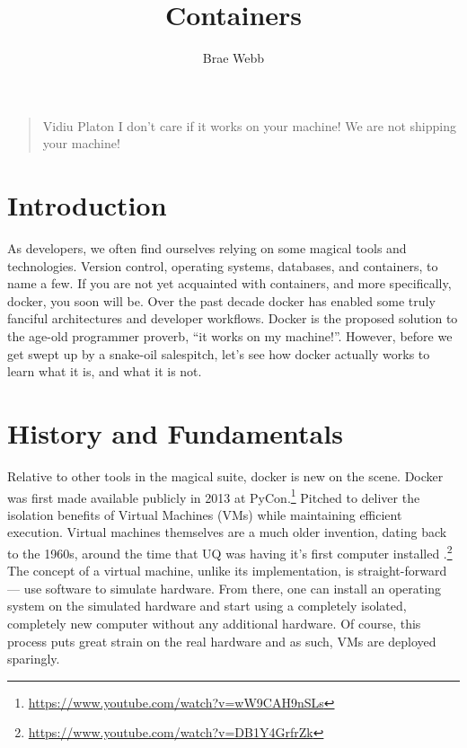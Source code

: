 \title{Containers}
\author{Brae Webb}
\date{}

\maketitle


\begin{quote}{Vidiu Platon}
I don't care if it works on your machine! We are not shipping your machine!
\end{quote}

\section{Introduction}
As developers, we often find ourselves relying on some magical tools and technologies.
Version control, operating systems, databases, and containers, to name a few.
If you are not yet acquainted with containers, and more specifically, docker, you soon will be.
Over the past decade docker has enabled some truly fanciful architectures and developer workflows.
Docker is the proposed solution to the age-old programmer proverb, ``it works on my machine!''.
However, before we get swept up by a snake-oil salespitch, let's see how docker actually works to learn what it is, and what it is not.

\section{History and Fundamentals}
Relative to other tools in the magical suite, docker is new on the scene.
Docker was first made available publicly in 2013 at PyCon.\footnote{\url{https://www.youtube.com/watch?v=wW9CAH9nSLs}}
Pitched to deliver the isolation benefits of Virtual Machines (VMs) while maintaining efficient execution.
Virtual machines themselves are a much older invention, dating back to the 1960s, around the time that UQ was having it's first computer installed%
.\footnote{\url{https://www.youtube.com/watch?v=DB1Y4GrfrZk}}
The concept of a virtual machine, unlike its implementation, is straight-forward --- use software to simulate hardware.
From there, one can install an operating system on the simulated hardware and start using a completely isolated, completely new computer without any additional hardware.
Of course, this process puts great strain on the real hardware and as such, VMs are deployed sparingly.

